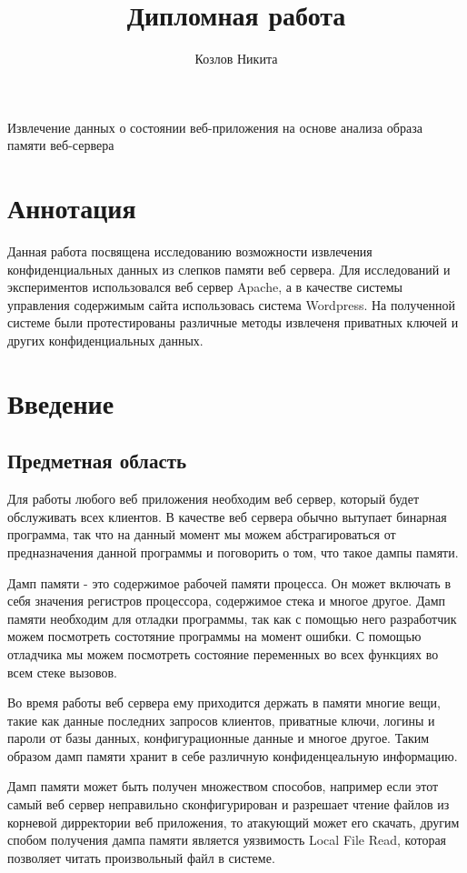 \documentclass[20pt]{article}
\title{Дипломная работа}
\author{Козлов Никита}
\begin{document}
{\huge Извлечение данных о состоянии веб-приложения на основе анализа образа памяти веб-сервера}

\newpage

\section*{Аннотация}

Данная работа посвящена исследованию возможности извлечения конфиденциальных данных из слепков памяти веб сервера. Для исследований и экспериментов использовался веб сервер Apache, а в качестве системы управления содержимым сайта использовась система Wordpress. На полученной системе были протестированы
различные методы извлеченя приватных ключей и других конфиденциальных данных.

\newpage

\tableofcontents

\newpage

\section{Введение}

\subsection{Предметная область}

Для работы любого веб приложения необходим веб сервер, который будет обслуживать всех клиентов. В качестве веб сервера обычно вытупает бинарная
программа, так что на данный момент мы можем абстрагироваться от предназначения данной программы и поговорить о том, что такое дампы памяти.

Дамп памяти - это содержимое рабочей памяти процесса. Он может включать в себя значения регистров процессора, содержимое стека и многое другое.
Дамп памяти необходим для отладки программы, так как с помощью него разработчик можем посмотреть состотяние программы на момент ошибки.
С помощью отладчика мы можем посмотреть состояние переменных во всех функциях во всем стеке вызовов.

Во время работы веб сервера ему приходится держать в памяти многие вещи, такие как данные последних запросов клиентов, приватные ключи, логины
и пароли от базы данных, конфигурационные данные и многое другое. Таким образом дамп памяти хранит в себе различную конфиденцеальную информацию.

Дамп памяти может быть получен множеством способов, например если этот самый веб сервер неправильно сконфигурирован и разрешает
чтение файлов из корневой дирректории веб приложения, то атакующий может его скачать, другим спобом получения дампа памяти
является уязвимость Local File Read, которая позволяет читать произвольный файл в системе.
\end{document}

